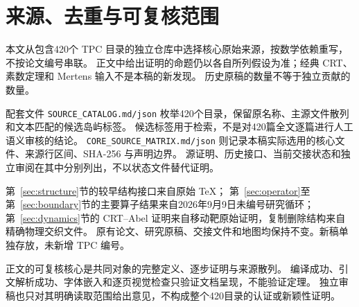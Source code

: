 \section{来源、去重与可复核范围}\label{sec:provenance}
本文从包含420个 TPC 目录的独立仓库中选择核心原始来源，按数学依赖重写，不按论文编号串联。
正文中给出证明的命题仍以各自所列假设为准；经典 CRT、素数定理和 Mertens 输入不是本稿的新发现。
历史原稿的数量不等于独立贡献的数量。

配套文件 \texttt{SOURCE\_CATALOG.md/json} 枚举420个目录，保留原名称、主源文件散列和文本匹配的候选岛屿标签。
候选标签用于检索，不是对420篇全文逐篇进行人工语义审核的结论。
\texttt{CORE\_SOURCE\_MATRIX.md/json} 则记录本稿实际选用的核心文件、来源行区间、SHA-256 与声明边界。
源证明、历史接口、当前交接状态和独立审阅在其中分别列出，不以状态文件替代证明。

第~\ref{sec:structure}节的较早结构接口来自原始 TeX；
第~\ref{sec:operator}至第~\ref{sec:boundary}节的主要算子结果来自2026年9月9日未编号研究循环；
第~\ref{sec:dynamics}节的 CRT--Abel 证明来自移动靶原始证明，复制删除结构来自精确物理交织文件。
原有论文、研究原稿、交接文件和地图均保持不变。新稿单独存放，未新增 TPC 编号。

正文的可复核核心是共同对象的完整定义、逐步证明与来源散列。
编译成功、引文解析成功、字体嵌入和逐页视觉检查只验证文档呈现，不能验证定理。
独立审稿也只对其明确读取范围给出意见，不构成整个420目录的认证或新颖性证明。
